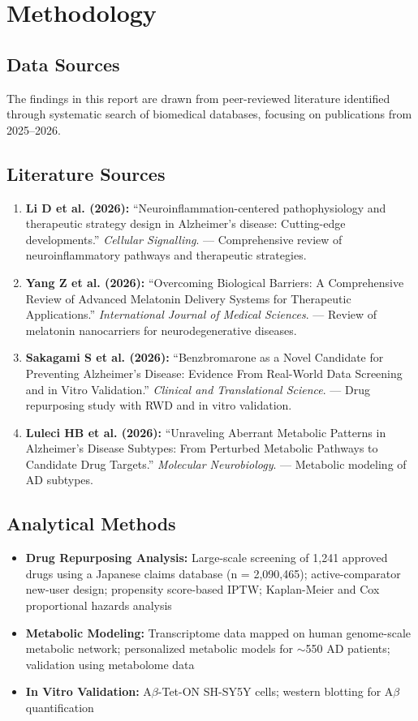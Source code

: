 \documentclass[11pt, a4paper]{article}
\begin{document}
\section{Methodology}

\subsection{Data Sources}
The findings in this report are drawn from peer-reviewed literature identified through systematic search of biomedical databases, focusing on publications from 2025--2026.

\subsection{Literature Sources}
\begin{enumerate}
    \item \textbf{Li D et al. (2026):} ``Neuroinflammation-centered pathophysiology and therapeutic strategy design in Alzheimer's disease: Cutting-edge developments.'' \textit{Cellular Signalling}. — Comprehensive review of neuroinflammatory pathways and therapeutic strategies.
    \item \textbf{Yang Z et al. (2026):} ``Overcoming Biological Barriers: A Comprehensive Review of Advanced Melatonin Delivery Systems for Therapeutic Applications.'' \textit{International Journal of Medical Sciences}. — Review of melatonin nanocarriers for neurodegenerative diseases.
    \item \textbf{Sakagami S et al. (2026):} ``Benzbromarone as a Novel Candidate for Preventing Alzheimer's Disease: Evidence From Real-World Data Screening and in Vitro Validation.'' \textit{Clinical and Translational Science}. — Drug repurposing study with RWD and in vitro validation.
    \item \textbf{Luleci HB et al. (2026):} ``Unraveling Aberrant Metabolic Patterns in Alzheimer's Disease Subtypes: From Perturbed Metabolic Pathways to Candidate Drug Targets.'' \textit{Molecular Neurobiology}. — Metabolic modeling of AD subtypes.
\end{enumerate}

\subsection{Analytical Methods}
\begin{itemize}
    \item \textbf{Drug Repurposing Analysis:} Large-scale screening of 1,241 approved drugs using a Japanese claims database (n = 2,090,465); active-comparator new-user design; propensity score-based IPTW; Kaplan-Meier and Cox proportional hazards analysis
    \item \textbf{Metabolic Modeling:} Transcriptome data mapped on human genome-scale metabolic network; personalized metabolic models for $\sim$550 AD patients; validation using metabolome data
    \item \textbf{In Vitro Validation:} A$\beta$-Tet-ON SH-SY5Y cells; western blotting for A$\beta$ quantification
\end{itemize}
\end{document}
